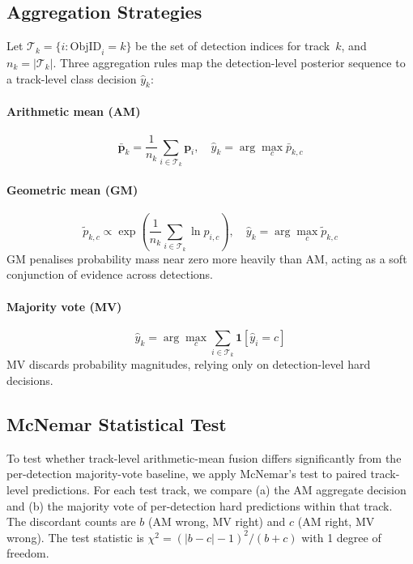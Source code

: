 \documentclass[10pt,journal,compsoc]{IEEEtran}
\begin{document}
\subsection{Aggregation Strategies}

Let $\mathcal{T}_k = \{i : \text{ObjID}_i = k\}$ be the set of detection indices
for track~$k$, and $n_k = |\mathcal{T}_k|$.  Three aggregation rules map the
detection-level posterior sequence to a track-level class decision
$\hat{y}_k$:

\paragraph{Arithmetic mean (AM)}
\begin{equation}
\bar{\mathbf{p}}_k = \frac{1}{n_k}\sum_{i\in\mathcal{T}_k}\mathbf{p}_i,\quad
\hat{y}_k = \arg\max_c \bar{p}_{k,c}
\end{equation}

\paragraph{Geometric mean (GM)}
\begin{equation}
\tilde{p}_{k,c} \propto \exp\!\left(\frac{1}{n_k}\sum_{i\in\mathcal{T}_k}\ln p_{i,c}\right),\quad
\hat{y}_k = \arg\max_c \tilde{p}_{k,c}
\end{equation}
GM penalises probability mass near zero more heavily than AM, acting as a
soft conjunction of evidence across detections.

\paragraph{Majority vote (MV)}
\begin{equation}
\hat{y}_k = \arg\max_c \sum_{i\in\mathcal{T}_k} \mathbf{1}[\hat{y}_i = c]
\end{equation}
MV discards probability magnitudes, relying only on detection-level
hard decisions.

\subsection{McNemar Statistical Test}

To test whether track-level arithmetic-mean fusion differs significantly from
the per-detection majority-vote baseline, we apply McNemar's test to
paired track-level predictions.  For each test track, we compare (a) the AM
aggregate decision and (b) the majority vote of per-detection hard predictions
within that track.  The discordant counts are $b$ (AM wrong, MV right) and
$c$ (AM right, MV wrong).  The test statistic is
$\chi^2 = (|b-c|-1)^2/(b+c)$ with 1 degree of freedom.
\end{document}

